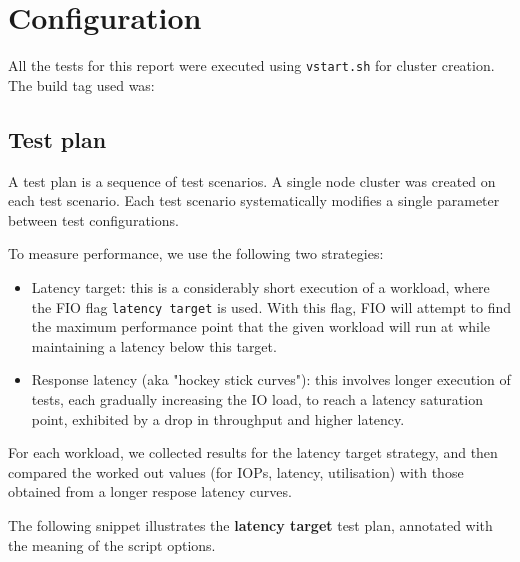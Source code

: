\chapter{Configuration}

All the tests for this report were executed using {\tt vstart.sh} for cluster creation. The build tag used was:

\section{Test plan}

A test plan is a sequence of test scenarios. A single node cluster was created on each test scenario. Each
test scenario systematically modifies a single parameter between test configurations. 

To measure performance, we use the following two strategies:

\begin{itemize}
  \item Latency target: this is a considerably short execution of a workload, where the FIO flag
    {\tt latency target}  is used. With this flag, FIO will attempt to find
    the maximum performance point that the given workload will run at while maintaining a
    latency below this target.
  \item Response latency (aka "hockey stick curves"): this involves longer execution of tests, each
    gradually increasing the IO load, to reach a latency saturation point, exhibited by a drop in
    throughput and higher latency. 
\end{itemize}

For each workload, we collected results for the latency target strategy, and then compared the worked out values (for IOPs, latency, utilisation) with those obtained from a longer respose latency curves.

The following snippet illustrates the {\bf latency target} test plan, annotated with the meaning of
the script options.

